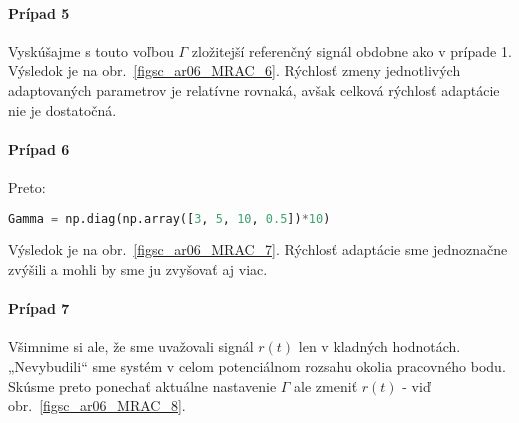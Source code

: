 \documentclass[a4paper, 10pt, ]{article}
\begin{document}
\begin{figure}[!b]
	\centering

    \vspace{-3mm}


    \vspace{-2mm}

	\caption{}
	\label{figsc_ar06_MRAC_5}


    \vspace{-2mm}

\end{figure}







\paragraph{Prípad 5}

Vyskúšajme s touto voľbou $\Gamma$ zložitejší referenčný signál obdobne ako v prípade 1. Výsledok je na obr.~\ref{figsc_ar06_MRAC_6}. Rýchlosť zmeny jednotlivých adaptovaných parametrov je relatívne rovnaká, avšak celková rýchlosť adaptácie nie je dostatočná.








\paragraph{Prípad 6}

Preto:
\begin{lstlisting}[language=Python,
                   numbers=none,
                    ]
Gamma = np.diag(np.array([3, 5, 10, 0.5])*10)
\end{lstlisting}
Výsledok je na obr.~\ref{figsc_ar06_MRAC_7}. Rýchlosť adaptácie sme jednoznačne zvýšili a mohli by sme ju zvyšovať aj viac.







\paragraph{Prípad 7}

Všimnime si ale, že sme uvažovali signál $r(t)$ len v kladných hodnotách. „Nevybudili“ sme systém v celom potenciálnom rozsahu okolia pracovného bodu. Skúsme preto ponechať aktuálne nastavenie $\Gamma$ ale zmeniť $r(t)$ - viď obr.~\ref{figsc_ar06_MRAC_8}.
\end{document}
